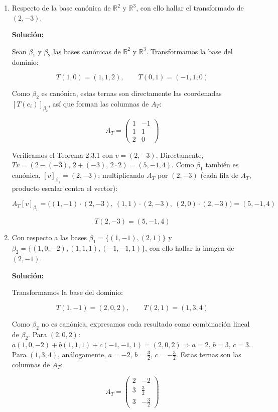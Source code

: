 \documentclass[12pt]{article}
\newcommand{\solucion}{%
    \vspace{0.8em}%
    \textbf{Solución:}%
    \vspace{0.8em}%
}
\begin{document}
\begin{enumerate}[label=\alph*.-]

    \item Respecto de la base canónica de $\mathbb{R}^2$ y
    $\mathbb{R}^3$, con ello hallar el transformado de $(2,-3)$.

    \solucion

    Sean $\beta_1$ y $\beta_2$ las bases canónicas de $\mathbb{R}^2$
    y $\mathbb{R}^3$. Transformamos la base del dominio:

    \[
    T(1,0)=(1,1,2), \qquad T(0,1)=(-1,1,0)
    \]

    Como $\beta_2$ es canónica, estas ternas son directamente las
    coordenadas $[T(e_i)]_{\beta_2}$, así que forman las columnas de
    $A_T$:

    \[
    \boxed{
    A_T=\begin{pmatrix}1&-1\\1&1\\2&0\end{pmatrix}
    }
    \]

    Verificamos el Teorema 2.3.1 con $v=(2,-3)$. Directamente,
    $Tv=(2-(-3),\,2+(-3),\,2\cdot2)=(5,-1,4)$. Como $\beta_1$
    también es canónica, $[v]_{\beta_1}=(2,-3)$; multiplicando
    $A_T$ por $(2,-3)$ (cada fila de $A_T$, producto escalar contra
    el vector):

    \[
    A_T[v]_{\beta_1}=\big((1,-1)\cdot(2,-3),\ (1,1)\cdot(2,-3),\ (2,0)\cdot(2,-3)\big)
    =(5,-1,4)
    \]

    \[
    \boxed{T(2,-3)=(5,-1,4)}
    \]


    \item Con respecto a las bases
    $\beta_1=\{(1,-1),(2,1)\}$ y
    $\beta_2=\{(1,0,-2),(1,1,1),(-1,-1,1)\}$, con ello hallar la
    imagen de $(2,-1)$.

    \solucion

    Transformamos la base del dominio:

    \[
    T(1,-1)=(2,0,2), \qquad T(2,1)=(1,3,4)
    \]

    Como $\beta_2$ no es canónica, expresamos cada resultado como
    combinación lineal de $\beta_2$. Para $(2,0,2)$:
    $a(1,0,-2)+b(1,1,1)+c(-1,-1,1)=(2,0,2)\Rightarrow a=2,\,b=3,\,c=3$.
    Para $(1,3,4)$, análogamente, $a=-2,\,b=\tfrac32,\,c=-\tfrac32$.
    Estas ternas son las columnas de $A_T$:

    \[
    \boxed{
    A_T=
    \begin{pmatrix}2&-2\\[2pt]3&\tfrac32\\[2pt]3&-\tfrac32\end{pmatrix}
    }
    \]


\end{enumerate}
\end{document}
